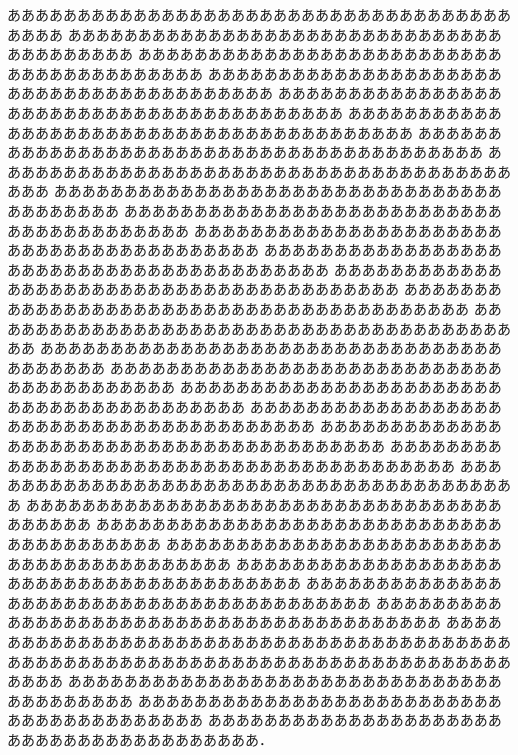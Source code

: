 \documentclass[twocolumn,tombow]{ltjsarticle}
\begin{document}
ああああああああああああああああああああああああああああああああああああああああ
ああああああああああああああああああああああああああああああああああああああああ
ああああああああああああああああああああああああああああああああああああああああ
ああああああああああああああああああああああああああああああああああああああああ
ああああああああああああああああああああああああああああああああああああああああ
ああああああああああああああああああああああああああああああああああああああああ
ああああああああああああああああああああああああああああああああああああああああ
ああああああああああああああああああああああああああああああああああああああああ
ああああああああああああああああああああああああああああああああああああああああ
ああああああああああああああああああああああああああああああああああああああああ
ああああああああああああああああああああああああああああああああああああああああ
ああああああああああああああああああああああああああああああああああああああああ
ああああああああああああああああああああああああああああああああああああああああ
ああああああああああああああああああああああああああああああああああああああああ
ああああああああああああああああああああああああああああああああああああああああ
ああああああああああああああああああああああああああああああああああああああああ
ああああああああああああああああああああああああああああああああああああああああ
ああああああああああああああああああああああああああああああああああああああああ
ああああああああああああああああああああああああああああああああああああああああ
ああああああああああああああああああああああああああああああああああああああああ
ああああああああああああああああああああああああああああああああああああああああ
ああああああああああああああああああああああああああああああああああああああああ
ああああああああああああああああああああああああああああああああああああああああ
ああああああああああああああああああああああああああああああああああああああああ
ああああああああああああああああああああああああああああああああああああああああ
ああああああああああああああああああああああああああああああああああああああああ
ああああああああああああああああああああああああああああああああああああああああ
ああああああああああああああああああああああああああああああああああああああああ
ああああああああああああああああああああああああああああああああああああああああ
ああああああああああああああああああああああああああああああああああああああああ
ああああああああああああああああああああああああああああああああああああああああ
ああああああああああああああああああああああああああああああああああああああああ
あああああああああああああああああああああああああああああああああああああああ．
\end{document}
